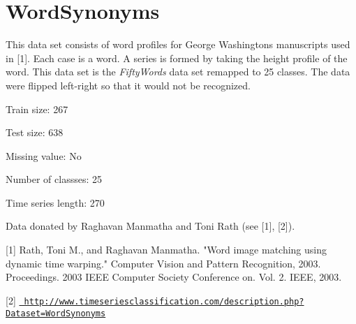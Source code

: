 \chapter{Word\+Synonyms}
\hypertarget{md_external_2data_2UCRArchive__2018_2WordSynonyms_2README}{}\label{md_external_2data_2UCRArchive__2018_2WordSynonyms_2README}
\label{md_external_2data_2UCRArchive__2018_2WordSynonyms_2README_autotoc_md231}%
%
 This data set consists of word profiles for George Washington\textquotesingle{}s manuscripts used in \mbox{[}1\mbox{]}. Each case is a word. A series is formed by taking the height profile of the word. This data set is the {\itshape Fifty\+Words} data set remapped to 25 classes. The data were flipped left-\/right so that it would not be recognized.

Train size\+: 267

Test size\+: 638

Missing value\+: No

Number of classses\+: 25

Time series length\+: 270

Data donated by Raghavan Manmatha and Toni Rath (see \mbox{[}1\mbox{]}, \mbox{[}2\mbox{]}).

\mbox{[}1\mbox{]} Rath, Toni M., and Raghavan Manmatha. "{}\+Word image matching using dynamic time warping."{} Computer Vision and Pattern Recognition, 2003. Proceedings. 2003 IEEE Computer Society Conference on. Vol. 2. IEEE, 2003.

\mbox{[}2\mbox{]} \href{http://www.timeseriesclassification.com/description.php?Dataset=WordSynonyms}{\texttt{ http\+://www.\+timeseriesclassification.\+com/description.\+php?\+Dataset=\+Word\+Synonyms}} 